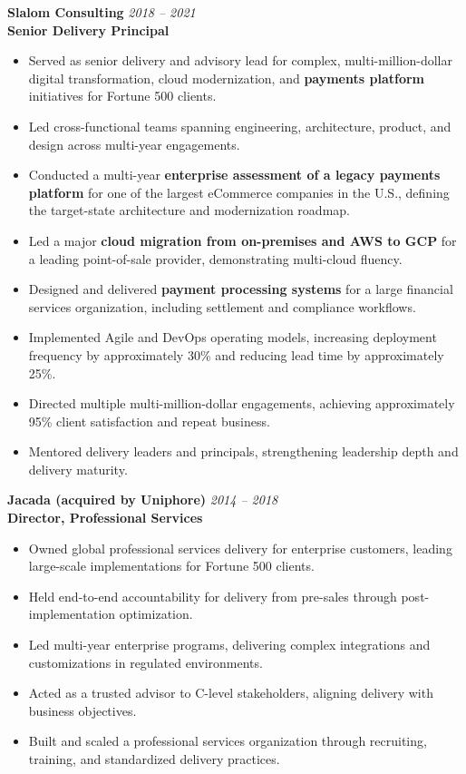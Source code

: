 \documentclass[11pt]{article}
\begin{document}
\vspace{6pt}

\pagebreak

\textbf{Slalom Consulting} \hfill \textit{2018 -- 2021} \\
\textbf{Senior Delivery Principal}

\begin{itemize}
  \item Served as senior delivery and advisory lead for complex, multi-million-dollar digital transformation, cloud modernization, and \textbf{payments platform} initiatives for Fortune 500 clients.
  \item Led cross-functional teams spanning engineering, architecture, product, and design across multi-year engagements.
  \item Conducted a multi-year \textbf{enterprise assessment of a legacy payments platform} for one of the largest eCommerce companies in the U.S., defining the target-state architecture and modernization roadmap.
  \item Led a major \textbf{cloud migration from on-premises and AWS to GCP} for a leading point-of-sale provider, demonstrating multi-cloud fluency.
  \item Designed and delivered \textbf{payment processing systems} for a large financial services organization, including settlement and compliance workflows.
  \item Implemented Agile and DevOps operating models, increasing deployment frequency by approximately 30\% and reducing lead time by approximately 25\%.
  \item Directed multiple multi-million-dollar engagements, achieving approximately 95\% client satisfaction and repeat business.
  \item Mentored delivery leaders and principals, strengthening leadership depth and delivery maturity.
\end{itemize}

\vspace{6pt}

\textbf{Jacada (acquired by Uniphore)} \hfill \textit{2014 -- 2018} \\
\textbf{Director, Professional Services}

\begin{itemize}
  \item Owned global professional services delivery for enterprise customers, leading large-scale implementations for Fortune 500 clients.
  \item Held end-to-end accountability for delivery from pre-sales through post-implementation optimization.
  \item Led multi-year enterprise programs, delivering complex integrations and customizations in regulated environments.
  \item Acted as a trusted advisor to C-level stakeholders, aligning delivery with business objectives.
  \item Built and scaled a professional services organization through recruiting, training, and standardized delivery practices.
\end{itemize}
\end{document}
